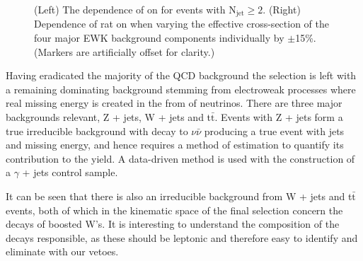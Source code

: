 \begin{figure}[h]
  \begin{center}
      \caption{\label{fig:rat_vs_ht} (Left) The dependence of \RaT on
      \HT for events with N$_{\mathrm{jet}} \geq 2$. (Right) Dependence of rat on
      \HT when varying the effective cross-section of the four major
      EWK background components individually by $\pm$15\%. (Markers
      are artificially offset for clarity.) }
  \end{center}
\end{figure}

Having eradicated the majority of the QCD background the selection is left with a remaining dominating background stemming from electroweak processes where real missing energy is created in the from of neutrinos. There are three major backgrounds relevant, Z + jets, W + jets and t$\bar{\textrm{t}}$. Events with Z + jets form a true irreducible background with decay to $\nu \bar{\nu}$ producing a true event with jets and missing energy, and hence requires a method of estimation to quantify its contribution to the yield. A data-driven method is used with the construction of a $\gamma$ + jets control sample.

It can be seen that there is also an irreducible background from W + jets and t$\bar{\textrm{t}}$ events, both of which in the kinematic space of the final selection concern the decays of boosted W's. It is interesting to understand the composition of the decays responsible, as these should be leptonic and therefore easy to identify and eliminate with our vetoes.

